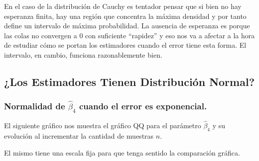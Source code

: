 \documentclass[]{article}
\newenvironment{Shaded}{\begin{snugshade}}{\end{snugshade}}
\newcommand{\DataTypeTok}[1]{\textcolor[rgb]{0.13,0.29,0.53}{#1}}
\newcommand{\DecValTok}[1]{\textcolor[rgb]{0.00,0.00,0.81}{#1}}
\newcommand{\KeywordTok}[1]{\textcolor[rgb]{0.13,0.29,0.53}{\textbf{#1}}}
\newcommand{\NormalTok}[1]{#1}
\newcommand{\OperatorTok}[1]{\textcolor[rgb]{0.81,0.36,0.00}{\textbf{#1}}}
\newcommand{\StringTok}[1]{\textcolor[rgb]{0.31,0.60,0.02}{#1}}
\begin{document}
En el caso de la distribución de Cauchy es tentador pensar que si bien
no hay esperanza finita, hay una región que concentra la máxima densidad
y por tanto define un intervalo de máxima probabilidad. La ausencia de
esperanza es porque las colas no convergen a 0 con suficiente
``rapidez'' y eso nos va a afectar a la hora de estudiar cómo se portan
los estimadores cuando el error tiene esta forma. El intervalo, en
cambio, funciona razonablemente bien.

\hypertarget{los-estimadores-tienen-distribucion-normal}{%
\subsection{¿Los Estimadores Tienen Distribución
Normal?}\label{los-estimadores-tienen-distribucion-normal}}

\hypertarget{normalidad-de-hatbeta_4-cuando-el-error-es-exponencial.}{%
\subsubsection{\texorpdfstring{Normalidad de \(\hat{\beta}_4\) cuando el
error es
exponencial.}{Normalidad de \textbackslash hat\{\textbackslash beta\}\_4 cuando el error es exponencial.}}\label{normalidad-de-hatbeta_4-cuando-el-error-es-exponencial.}}

El siguiente gráfico nos muestra el gráfico QQ para el parámetro
\(\hat{\beta}_4\) y su evolución al incrementar la cantidad de muestras
\(n\).

El mismo tiene una escala fija para que tenga sentido la comparación
gráfica.

\begin{Shaded}
\end{Shaded}
\end{document}
